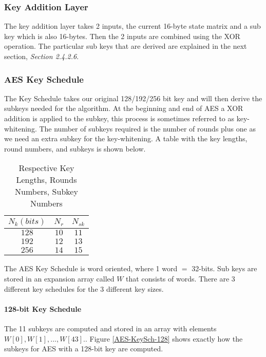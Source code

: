 \subsubsection{Key Addition Layer}

The key addition layer takes 2 inputs, the current 16-byte state matrix and a sub key which is also 16-bytes. Then the 2 inputs are combined using the XOR operation. The particular sub keys that are derived are explained in the next section, \textit{Section 2.4.2.6}.

\subsubsection{AES Key Schedule}

The Key Schedule takes our original 128/192/256 bit key and will then derive the subkeys needed for the algorithm. At the beginning and end of AES a XOR addition is applied to the subkey, this process is sometimes referred to as key-whitening. The number of subkeys required is the number of rounds plus one as we need an extra subkey for the key-whitening. A table with the key lengths, round numbers, and subkeys is shown below.

\begin{table}[H]
\begin{center}
\begin{tabular}{ c|c|c } 
$N_k (bits)$ & $N_r$ & $N_{sk}$ \\
\hline
$128$ & $10$ & $11$ \\
$192$ & $12$ & $13$ \\
$256$ & $14$ & $15$ \\
\end{tabular}
\caption{Respective Key Lengths, Rounds Numbers, Subkey Numbers}
\label{AES-KeyL-RoundNumber-Subkeys}
\end{center}
\end{table}

The AES Key Schedule is word oriented, where 1 word $=$ 32-bits. Sub keys are stored in an expansion array called $W$ that consists of words. There are 3 different key schedules for the 3 different key sizes.

\paragraph{128-bit Key Schedule}

The 11 subkeys are computed and stored in an array with elements $W[0], W[1], ..., W[43].$. Figure \ref{AES-KeySch-128} shows exactly how the subkeys for AES with a 128-bit key are computed. 

